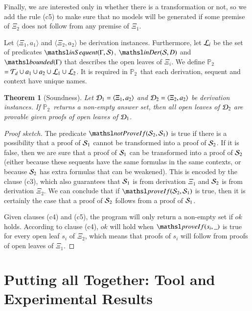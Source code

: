 \documentclass{new_tlp}
\newcommand{\inSequent}[2]{\ensuremath{\tsl{inSequent}(\ensuremath{#1},\ensuremath{#2})}}
\newcommand{\inDer}[2]{\ensuremath{\tsl{inDer}(\ensuremath{#1},\ensuremath{#2})}}
\newcommand{\provIf}[2]{\ensuremath{\tsl{proveIf}(\ensuremath{#1},\ensuremath{#2})}}
\newcommand{\notProvIf}[2]{\ensuremath{\tsl{notProveIf}(\ensuremath{#1},\ensuremath{#2})}}
\newcommand{\bounded}[1]{\ensuremath{{\tsl{bounded}(\ensuremath{#1})}}}
\newcommand\LPprov{\ensuremath{\mathbb{P}_2}}
\newtheorem{theorem}{Theorem}
\begin{document}
Finally, we are interested only in whether there is a transformation or not, so we add the
rule (c5) to make sure that no models will be generated if some premise of $\Xi_2$ does not follow
from any premise of $\Xi_1$.

Let $\langle \Xi_1, a_1 \rangle$ and $\langle \Xi_2, a_2 \rangle$ be
derivation instances. Furthermore, let ${\mathcal L}_i$ be the set of predicates
$\inSequent{\Gamma}{\Sscr}$, $\inDer{\Sscr}{D}$ and $\bounded{\Gamma}$
that describes the open leaves of $\Xi_i$. We define \LPprov\ $=
\Tscr_d \cup a_1 \cup a_2 \cup \Lscr_1 \cup \Lscr_2$. It is required in \LPprov\
that each derivation, sequent and context have unique names.

\begin{theorem}[Soundness]
Let $\Dscr_1 = \langle \Xi_1, a_2 \rangle$ and $\Dscr_2 = \langle \Xi_2, a_2 \rangle$ be derivation
instances.
If \LPprov\ returns a non-empty answer set, then all open leaves of $\Dscr_2$
are provable given proofs of open leaves of $\Dscr_1$.
\end{theorem}

\begin{proof}[Proof sketch]
The predicate $\notProvIf{\Sscr_2}{\Sscr_1}$ is true if there is a possibility
that a proof of $\Sscr_1$ cannot be transformed into a proof of $\Sscr_2$. If it
is false, then we are sure that a proof of $\Sscr_1$ can be transformed into a
proof of $\Sscr_2$ (either because these sequents have the same formulas in the
same contexts, or because $\Sscr_2$ has extra formulas that can be weakened). This is
encoded by the clause (c3), which also guarantees that $\Sscr_1$ is from
derivation $\Xi_1$ and $\Sscr_2$ is from derivation $\Xi_2$. We can conclude
that if $\provIf{\Sscr_2}{\Sscr_1}$ is true, then it is certainly the case that
a proof of $\Sscr_2$ follows from a proof of $\Sscr_1$.

Given clauses (c4) and (c5), the program will
only return a non-empty set if $ok$ holds. According to clause (c4), $ok$ will
hold when $\provIf{s_i}{\_}$ is true for every open leaf $s_i$ of $\Xi_2$, which
means that proofs of $s_i$ will follow from proofs of open leaves of $\Xi_1$.
\end{proof}

\section{Putting all Together: Tool and Experimental Results}
\label{sec:together}
\end{document}

